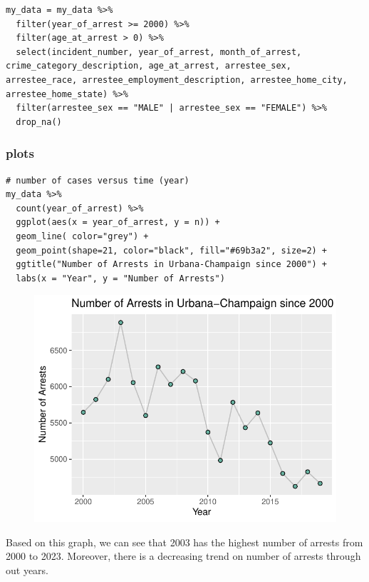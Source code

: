 \documentclass[
  article]{jss}
\begin{document}
\begin{verbatim}
my_data = my_data %>% 
  filter(year_of_arrest >= 2000) %>% 
  filter(age_at_arrest > 0) %>% 
  select(incident_number, year_of_arrest, month_of_arrest, crime_category_description, age_at_arrest, arrestee_sex, arrestee_race, arrestee_employment_description, arrestee_home_city, arrestee_home_state) %>% 
  filter(arrestee_sex == "MALE" | arrestee_sex == "FEMALE") %>% 
  drop_na()
\end{verbatim}

\hypertarget{plots}{%
\subsubsection{plots}\label{plots}}

\begin{verbatim}
# number of cases versus time (year)
my_data %>% 
  count(year_of_arrest) %>% 
  ggplot(aes(x = year_of_arrest, y = n)) +
  geom_line( color="grey") +
  geom_point(shape=21, color="black", fill="#69b3a2", size=2) +
  ggtitle("Number of Arrests in Urbana-Champaign since 2000") +
  labs(x = "Year", y = "Number of Arrests")
\end{verbatim}

\begin{figure}[H]

{\centering \includegraphics{progress-report_files/figure-pdf/unnamed-chunk-5-1.pdf}

}

\end{figure}

Based on this graph, we can see that 2003 has the highest number of
arrests from 2000 to 2023. Moreover, there is a decreasing trend on
number of arrests through out years.
\end{document}
